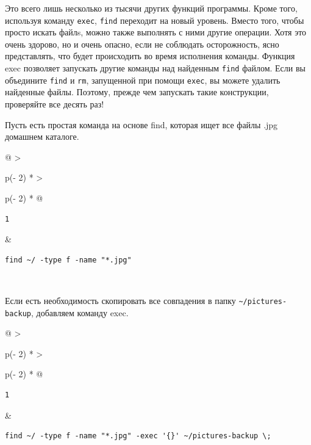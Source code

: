 \documentclass{report}
\begin{document}
Это всего лишь несколько из тысячи других функций программы. Кроме того,
используя команду \texttt{exec}, \texttt{find} переходит на новый
уровень. Вместо того, чтобы просто искать файлs, можно также выполнять с
ними другие операции. Хотя это очень здорово, но и очень опасно, если не
соблюдать осторожность, ясно представлять, что будет происходить во
время исполнения команды. Функция exec позволяет запускать другие
команды над найденным \texttt{find} файлом. Если вы объедините
\texttt{find} и \texttt{rm}, запущенной при помощи \texttt{exec}, вы
можете удалить найденные файлы. Поэтому, прежде чем запускать такие
конструкции, проверяйте все десять раз!

Пусть есть простая команда на основе find, которая ищет все файлы .jpg
домашнем каталоге.

\begin{longtable}[]{@{}
  >{\raggedright\arraybackslash}p{(\columnwidth - 2\tabcolsep) * }
  >{\raggedright\arraybackslash}p{(\columnwidth - 2\tabcolsep) * }@{}}
\toprule
\endhead
\begin{minipage}[t]{\linewidth}\raggedright
\begin{verbatim}
1
\end{verbatim}
\end{minipage} & \begin{minipage}[t]{\linewidth}\raggedright
\begin{verbatim}
find ~/ -type f -name "*.jpg"
\end{verbatim}
\end{minipage} \\ \addlinespace
\bottomrule
\end{longtable}

Если есть необходимость скопировать все совпадения в папку
\texttt{\textasciitilde{}/pictures-backup}, добавляем команду exec.

\begin{longtable}[]{@{}
  >{\raggedright\arraybackslash}p{(\columnwidth - 2\tabcolsep) * }
  >{\raggedright\arraybackslash}p{(\columnwidth - 2\tabcolsep) * }@{}}
\toprule
\endhead
\begin{minipage}[t]{\linewidth}\raggedright
\begin{verbatim}
1
\end{verbatim}
\end{minipage} & \begin{minipage}[t]{\linewidth}\raggedright
\begin{verbatim}
find ~/ -type f -name "*.jpg" -exec '{}' ~/pictures-backup \;
\end{verbatim}
\end{minipage} \\ \addlinespace
\bottomrule
\end{longtable}
\end{document}
